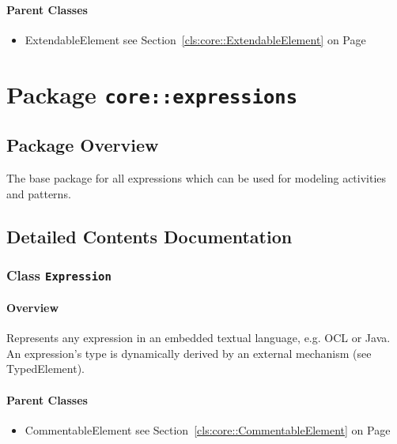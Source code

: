 	



\paragraph{Parent Classes}
\begin{itemize}
\item ExtendableElement see Section~\ref{cls:core::ExtendableElement} on Page~\pageref{cls:core::ExtendableElement}\end{itemize}
\newpage
		


\section{Package \bfseries \texttt{core::expressions}\normalfont}
\subsection{Package Overview}
	
			
The base package for all expressions which can be used for modeling activities
and patterns.	
		
	
			
		



\subsection{Detailed Contents Documentation}
\subsubsection{\Large{Class \bfseries \texttt{Expression}\normalfont}}
\label{cls:core::expressions::Expression} 
\paragraph{Overview}

	
			
Represents any expression in an embedded textual language, e.g. OCL or Java. An expression's type is dynamically derived by an external mechanism (see TypedElement).	
		
	



\paragraph{Parent Classes}
\begin{itemize}
\item CommentableElement see Section~\ref{cls:core::CommentableElement} on Page~\pageref{cls:core::CommentableElement}\end{itemize}
